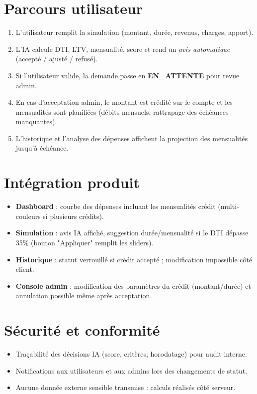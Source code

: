 \documentclass[12pt,a4paper]{report}
\begin{document}
\section{Parcours utilisateur}
\begin{enumerate}[leftmargin=1.3cm]
    \item L'utilisateur remplit la simulation (montant, durée, revenus, charges, apport).
    \item L'IA calcule DTI, LTV, mensualité, score et rend un \textit{avis automatique} (accepté / ajusté / refusé).
    \item Si l'utilisateur valide, la demande passe en \textbf{EN\_ATTENTE} pour revue admin.
    \item En cas d'acceptation admin, le montant est crédité sur le compte et les mensualités sont planifiées (débits mensuels, rattrapage des échéances manquantes).
    \item L'historique et l'analyse des dépenses affichent la projection des mensualités jusqu'à échéance.
\end{enumerate}

\section{Intégration produit}
\begin{itemize}[leftmargin=1.3cm]
    \item \textbf{Dashboard} : courbe des dépenses incluant les mensualités crédit (multi-couleurs si plusieurs crédits).
    \item \textbf{Simulation} : avis IA affiché, suggestion durée/mensualité si le DTI dépasse 35\% (bouton "Appliquer" remplit les sliders).
    \item \textbf{Historique} : statut verrouillé si crédit accepté ; modification impossible côté client.
    \item \textbf{Console admin} : modification des paramètres du crédit (montant/durée) et annulation possible même après acceptation.
\end{itemize}

\section{Sécurité et conformité}
\begin{itemize}[leftmargin=1.3cm]
    \item Traçabilité des décisions IA (score, critères, horodatage) pour audit interne.
    \item Notifications aux utilisateurs et aux admins lors des changements de statut.
    \item Aucune donnée externe sensible transmise : calculs réalisés côté serveur.
\end{itemize}
\end{document}
